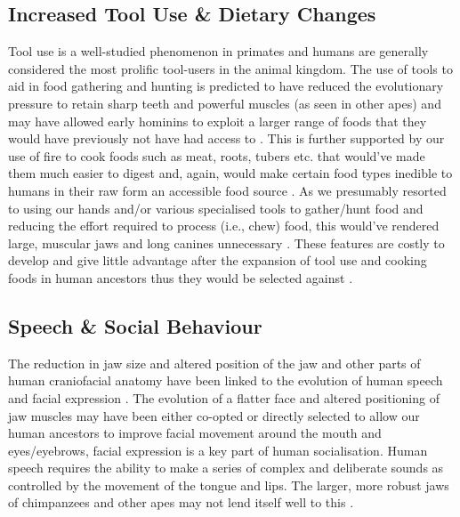 \documentclass{article}[12pt]
\begin{document}
\subsection*{Increased Tool Use \& Dietary Changes} 

Tool use is a well-studied phenomenon in primates and humans are generally considered the most prolific tool-users in the animal kingdom. The use of tools to aid in food gathering and hunting is predicted to have reduced the evolutionary pressure to retain sharp teeth and powerful muscles (as seen in other apes) and may have allowed early hominins to exploit a larger range of foods that they would have previously not have had access to \parencite{Stedman2004, Leonard1992, Lucas2008, Pinhasi2008}. This is further supported by our use of fire to cook foods such as meat, roots, tubers etc. that would’ve made them much easier to digest and, again, would make certain food types inedible to humans in their raw form an accessible food source \parencite{Wrangham1999}. As we presumably resorted to using our hands and/or various specialised tools to gather/hunt food and reducing the effort required to process (i.e., chew) food, this would’ve rendered large, muscular jaws and long canines unnecessary \parencite{Armelagos1989, Emes2011}. These features are costly to develop and give little advantage after the expansion of tool use and cooking foods in human ancestors thus they would be selected against \parencite{Leonard1992, Lucas2008}.

\subsection*{Speech \& Social Behaviour}

The reduction in jaw size and altered position of the jaw and other parts of human craniofacial anatomy have been linked to the evolution of human speech and facial expression \parencite{Davidson2005, Raia2018, Vallender2008, jawsandspeech}. The evolution of a flatter face and altered positioning of jaw muscles may have been either co-opted or directly selected to allow our human ancestors to improve facial movement around the mouth and eyes/eyebrows, facial expression is a key part of human socialisation. Human speech requires the ability to make a series of complex and deliberate sounds as controlled by the movement of the tongue and lips. The larger, more robust jaws of chimpanzees and other apes may not lend itself well to this \parencite{Raia2018, Yuan2019}.
\end{document}
